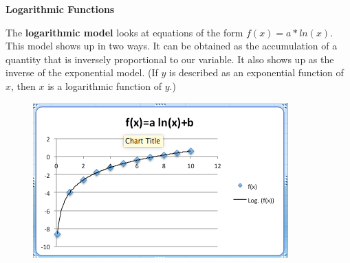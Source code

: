 \documentclass[10pt,]{book}
\newcommand{\terminology}[1]{\textbf{#1}}
\theoremstyle{plain}
\theoremstyle{definition}
\theoremstyle{definition}
\begin{document}
\terminology{Logarithmic Functions}%
\par
The \terminology{logarithmic model} looks at equations of the form \(f(x)=a*ln(x)\).  This model shows up in two ways.  It can be obtained as the accumulation of a quantity that is inversely proportional to our variable.  It also shows up as the inverse of the exponential model.  (If \(y\) is described as an exponential function of \(x\), then \(x\) is a logarithmic function of \(y\).)%
\leavevmode%
\begin{figure}
\centering
\includegraphics[width=0.5\linewidth]{images/sec1-2-LogCurve.png}
\end{figure}
\typeout{************************************************}
\typeout{************************************************}
\end{document}
